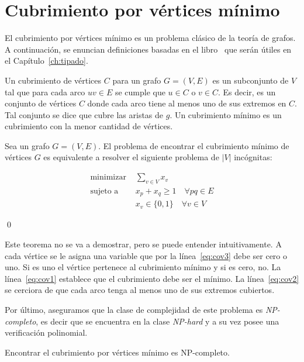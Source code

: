\section{Cubrimiento por vértices mínimo}
El cubrimiento por vértices mínimo es un problema clásico de la teoría de grafos. A continuación, se enuncian definiciones basadas en el libro~\cite{vertex_cover} que serán útiles en el Capítulo~\ref{ch:tipado}.

\begin{definicion}\label{def:min_cover}
Un cubrimiento de vértices $C$ para un grafo $G=(V,E)$ es un subconjunto de $V$ tal que para cada arco $uv \in E$ se cumple que $u \in C$ o $v \in C$. Es decir, es un conjunto de vértices $C$ donde cada arco tiene al menos uno de sus extremos en $C$. Tal conjunto se dice que cubre las aristas de $g$. Un cubrimiento mínimo es un cubrimiento con la menor cantidad de vértices.
\end{definicion}

\begin{teorema}\label{teo:cover_lin}
    Sea un grafo $G=(V,E)$. El problema de encontrar el cubrimiento mínimo de vértices $G$ es equivalente a resolver el siguiente problema de $|V|$ incógnitas:
    \begin{mdframed}\begin{align}
        \text{minimizar }&\sum_{v\in V} x_v\label{eq:cov1}\\
        \text{sujeto a }&x_p + x_q \geq 1 \quad \forall pq \in E\label{eq:cov2}\\
        &x_v \in \{0, 1\} \quad \forall v\in V\label{eq:cov3}
    \end{align}\end{mdframed}\qed
\end{teorema}
Este teorema no se va a demostrar, pero se puede entender intuitivamente. A cada vértice se le asigna una variable que por la línea~\ref{eq:cov3} debe ser cero o uno. Si es uno el vértice pertenece al cubrimiento mínimo y si es cero, no. La línea~\ref{eq:cov1} establece que el cubrimiento debe ser el mínimo. La línea~\ref{eq:cov2} se cerciora de que cada arco tenga al menos uno de sus extremos cubiertos.

Por último, aseguramos que la clase de complejidad de este problema es \emph{NP-completo}, es decir que se encuentra en la clase \emph{NP-hard} y a su vez posee una verificación polinomial.

\begin{teorema}
    Encontrar el cubrimiento por vértices mínimo es NP-completo.
\end{teorema}

